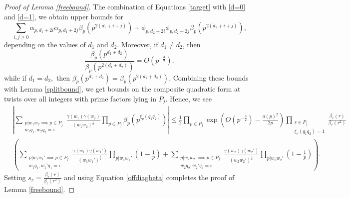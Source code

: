 \documentclass[12pt]{amsart}
\numberwithin{equation}{section}
\numberwithin{thm}{section}
\newcommand{\1}{\mathbf 1}
\begin{document}
\begin{proof}[Proof of Lemma \ref{freebound}]
	The combination of Equations \eqref{target} with \eqref{d=0} and \eqref{d=1}, we obtain upper bounds for $$\sum_{i,j\ge 0} \alpha_{p, d_1+2i}\alpha_{p, d_1+2j} \beta_p(p^{2(d_1+i+j)})+\phi_{p, d_2+2i}\phi_{p, d_2+2j} \beta_p(p^{2(d_2+i+j)}),$$ depending on the values of $d_1$ and $d_2$.
	Moreover, if $d_1\ne d_2$, then \begin{equation}\label{offdiagbeta}
		\frac{\beta_p(p^{d_1+d_2})}{\beta_p(p^{2(d_1+d_2)})}=O\left(p^{-\frac{3}{2}}\right),
	\end{equation} while if $d_1=d_2,$ then $\beta_p(p^{d_1+d_2})=\beta_p(p^{2(d_1+d_2)}).$
	Combining these bounds with Lemma \ref{splitbound}, we get bounds on the composite quadratic form at twists over all integers with prime factors lying in $P_j$. Hence, we see \begin{align}
	\nonumber&	\left|\sum_{\substack{p|w_1w_2\implies p\in P_{j}\\ w_1q_1,w_2q_2=\square}}
		\frac{\gamma(w_1)\gamma(w_2)}{(w_1w_2)^{\frac{1}{2}}} \prod_{p\in P_{j}} 	\beta_p(p^{\xi_p(q_1q_2)})\right|\le\frac{1}{2}\prod_{p\in P_j} \exp\left(O\left(p^{-\frac{3}{2}}\right)-\frac{a(p)^2}{2p}\right) \prod_{\substack{r\in P_j\\ \xi_r(q_1q_2)=1}}\frac{\beta_r(r)}{\beta_r(r^2)}\\& \left(\sum_{\substack{p|w_1w_1'\implies p\in P_{j}\\ w_1q_1,w_1'q_1=\square}}
		\frac{\gamma(w_1)\gamma(w_1')}{(w_1w_1')^{\frac{1}{2}}} \prod_{p|w_1w_1'} 	\left(1-\frac{1}{p}\right)+\sum_{\substack{p|w_2w_2'\implies p\in P_{j}\\ w_2q_2,w_2'q_2=\square}}
		\frac{\gamma(w_2)\gamma(w_2')}{(w_2w_2')^{\frac{1}{2}}} \prod_{p|w_2w_2'} 	\left(1-\frac{1}{p}\right)\right).
	\end{align}
	Setting $s_r=\frac{\beta_r(r)}{\beta_r(r^2)}$ and using Equation \eqref{offdiagbeta} completes the proof of Lemma
		 \ref{freebound}. 
	\end{proof}
	\appendix
\end{document}
